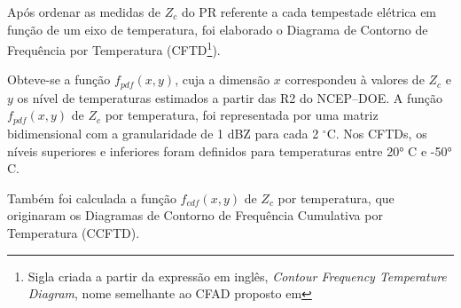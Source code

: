 Após ordenar as medidas de $Z_c$ do PR referente a cada tempestade elétrica em função de um eixo de temperatura, foi elaborado o Diagrama de Contorno de Frequência por Temperatura (CFTD\footnote{Sigla criada a partir da expressão em inglês, \textit{Contour Frequency Temperature Diagram}, nome semelhante ao CFAD proposto em }).




Obteve-se a função $f_{pdf}(x,y)$, cuja a dimensão $x$ correspondeu à valores de $Z_{c}$ e $y$ os nível de temperaturas estimados a partir das R2 do NCEP--DOE. A função $f_{pdf}(x,y)$ de $Z_c$ por temperatura, foi representada por uma matriz bidimensional com a granularidade de 1 dBZ para cada 2 $^{\circ}$C. Nos CFTDs, os níveis superiores e inferiores foram definidos para temperaturas entre 20° C e -50° C.

Também foi calculada a função $f_{cdf}(x,y)$ de $Z_c$ por temperatura, que originaram os Diagramas de Contorno de Frequência Cumulativa por Temperatura (CCFTD).     

